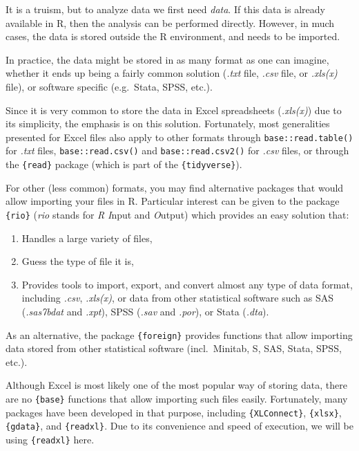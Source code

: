 \documentclass[
]{book}
\providecommand{\tightlist}{%
  \setlength{\itemsep}{0pt}\setlength{\parskip}{0pt}}
\begin{document}
It is a truism, but to analyze data we first need \emph{data}. If this data is already available in R, then the analysis can be performed directly. However, in much cases, the data is stored outside the R environment, and needs to be imported.

In practice, the data might be stored in as many format as one can imagine, whether it ends up being a fairly common solution (\emph{.txt} file, \emph{.csv} file, or \emph{.xls(x)} file), or software specific (e.g.~Stata, SPSS, etc.).

Since it is very common to store the data in Excel spreadsheets (\emph{.xls(x)}) due to its simplicity, the emphasis is on this solution. Fortunately, most generalities presented for Excel files also apply to other formats through \texttt{base::read.table()} for \emph{.txt} files, \texttt{base::read.csv()} and \texttt{base::read.csv2()} for \emph{.csv} files, or through the \texttt{\{read\}} package (which is part of the \texttt{\{tidyverse\}}).

For other (less common) formats, you may find alternative packages that would allow importing your files in R. Particular interest can be given to the package \texttt{\{rio\}} (\emph{rio} stands for \emph{R} \emph{I}nput and \emph{O}utput) which provides an easy solution that:

\begin{enumerate}
\def\labelenumi{\arabic{enumi}.}
\tightlist
\item
  Handles a large variety of files,
\item
  Guess the type of file it is,
\item
  Provides tools to import, export, and convert almost any type of data format, including \emph{.csv}, \emph{.xls(x)}, or data from other statistical software such as SAS (\emph{.sas7bdat} and \emph{.xpt}), SPSS (\emph{.sav} and \emph{.por}), or Stata (\emph{.dta}).
\end{enumerate}

As an alternative, the package \texttt{\{foreign\}} provides functions that allow importing data stored from other statistical software (incl.~Minitab, S, SAS, Stata, SPSS, etc.).

Although Excel is most likely one of the most popular way of storing data, there are no \texttt{\{base\}} functions that allow importing such files easily. Fortunately, many packages have been developed in that purpose, including \texttt{\{XLConnect\}}, \texttt{\{xlsx\}}, \texttt{\{gdata\}}, and \texttt{\{readxl\}}. Due to its convenience and speed of execution, we will be using \texttt{\{readxl\}} here.
\end{document}

